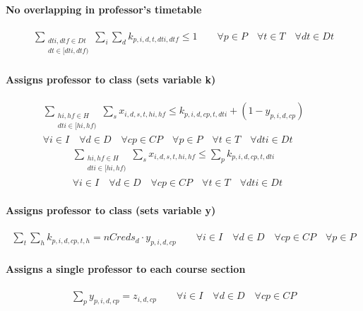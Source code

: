 \paragraph{No overlapping in professor's timetable}
\begin{eqnarray}
\sum_{ \substack {dti,dtf \in Dt \\ dt \in [dti,dtf)} } \sum\limits_{i} \sum\limits_{d} k_{p,i,d,t,dti,dtf} \le 1 \nonumber \qquad
\forall p \in P \quad
\forall t \in T \quad
\forall dt \in Dt
\end{eqnarray}

\paragraph{Assigns professor to class (sets variable k)}
\begin{eqnarray}
\sum_{ \substack {hi,hf \in H \\ dti \in [hi,hf)} } \sum\limits_{s} x_{i,d,s,t,hi,hf} \le k_{p,i,d,cp,t,dti} + ( 1 - y_{p,i,d,cp} ) \nonumber \qquad
\\
\forall i \in I \quad
\forall d \in D \quad
\forall cp \in CP \quad
\forall p \in P \quad
\forall t \in T \quad
\forall dti \in Dt
\end{eqnarray}
\begin{eqnarray}
\sum_{ \substack {hi,hf \in H \\ dti \in [hi,hf)} } \sum\limits_{s} x_{i,d,s,t,hi,hf} \le \sum\limits_{p} k_{p,i,d,cp,t,dti} \nonumber \qquad
\\
\forall i \in I \quad
\forall d \in D \quad
\forall cp \in CP \quad
\forall t \in T \quad
\forall dti \in Dt
\end{eqnarray}
	
\paragraph{Assigns professor to class (sets variable y)}
\begin{eqnarray}
\sum\limits_{t} \sum\limits_{h} k_{p,i,d,cp,t,h} = nCreds_{d} \cdot y_{p,i,d,cp} \nonumber \qquad
\forall i \in I \quad
\forall d \in D \quad
\forall cp \in CP \quad
\forall p \in P
\end{eqnarray}	
	
\paragraph{Assigns a single professor to each course section}
\begin{eqnarray}
\sum\limits_{p} y_{p,i,d,cp} = z_{i,d,cp} \nonumber \qquad
\forall i \in I \quad
\forall d \in D \quad
\forall cp \in CP
\end{eqnarray}	


